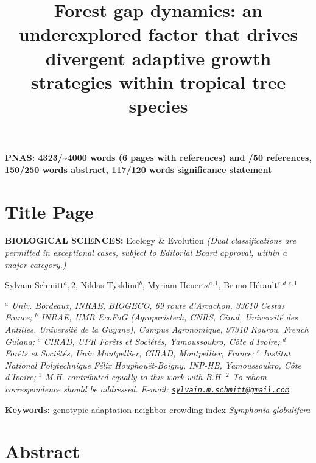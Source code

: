 \documentclass[
]{article}
\title{\textbf{Forest gap dynamics: an underexplored factor that drives divergent adaptive growth strategies within tropical tree species}}
\author{}
\date{\vspace{-2.5em}}
\makeatletter
\newcommand\iraggedright{%
  \let\\\@centercr\@rightskip\@flushglue \rightskip\@rightskip
  \leftskip\z@skip}
\makeatother
\begin{document}
\maketitle

\iraggedright

\textbf{PNAS: 4323/\textasciitilde4000 words (6 pages with references) and /50 references, 150/250 words abstract, 117/120 words significance statement}

\hypertarget{title-page}{%
\section{Title Page}\label{title-page}}

\textbf{BIOLOGICAL SCIENCES:} Ecology \& Evolution \emph{(Dual classifications are permitted in exceptional cases, subject to Editorial Board approval, within a major category.)}

Sylvain Schmitt\(^a,2\),
Niklas Tysklind\(^b\),
Myriam Heuertz\(^{a,1}\),
Bruno Hérault\(^{c,d,e,1}\)

\emph{\(^a\) Univ. Bordeaux, INRAE, BIOGECO, 69 route d'Arcachon, 33610 Cestas France;}
\emph{\(^b\) INRAE, UMR EcoFoG (Agroparistech, CNRS, Cirad, Université des Antilles, Université de la Guyane), Campus Agronomique, 97310 Kourou, French Guiana;}
\emph{\(^c\) CIRAD, UPR Forêts et Sociétés, Yamoussoukro, Côte d'Ivoire;}
\emph{\(^d\) Forêts et Sociétés, Univ Montpellier, CIRAD, Montpellier, France;}
\emph{\(^e\) Institut National Polytechnique Félix Houphouët-Boigny, INP-HB, Yamoussoukro, Côte d'Ivoire;}
\emph{\(^{1}\) M.H. contributed equally to this work with B.H.}
\emph{\(^{2}\) To whom correspondence should be addressed. E-mail: \href{mailto:sylvain.m.schmitt@gmail.com}{\nolinkurl{sylvain.m.schmitt@gmail.com}}}

\textbf{Keywords:} genotypic adaptation \textbar{} neighbor crowding index \textbar{} \emph{Symphonia globulifera}

\hypertarget{abstract}{%
\section{Abstract}\label{abstract}}
\end{document}
